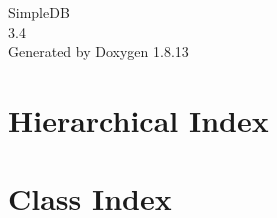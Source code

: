 \documentclass[twoside]{book}
\newcommand{\+}{\discretionary{\mbox{\scriptsize$\hookleftarrow$}}{}{}}
\newcommand{\clearemptydoublepage}{%
  \newpage{\pagestyle{empty}\cleardoublepage}%
}
\begin{document}
\hypersetup{pageanchor=false,
             bookmarksnumbered=true,
             pdfencoding=unicode
            }
\begin{titlepage}
\vspace*{7cm}
\begin{center}%
{\Large Simple\+DB \\[1ex]\large 3.\+4 }\\
\vspace*{1cm}
{\large Generated by Doxygen 1.8.13}\\
\end{center}
\end{titlepage}
\clearemptydoublepage
{}
\tableofcontents
\clearemptydoublepage
{}
\hypersetup{pageanchor=true}

\chapter{Hierarchical Index}

\chapter{Class Index}

\end{document}
